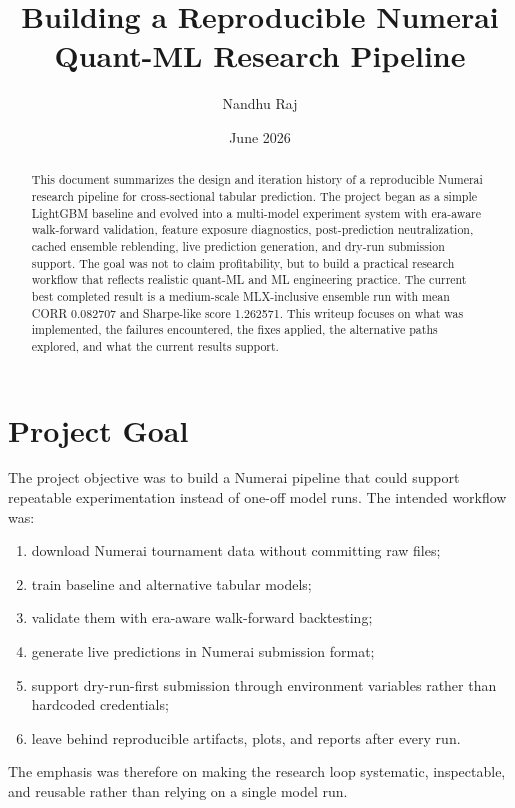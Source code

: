 \documentclass[11pt]{article}
\title{Building a Reproducible Numerai Quant-ML Research Pipeline}
\author{Nandhu Raj}
\date{June 2026}
\begin{document}
\maketitle

\begin{abstract}
This document summarizes the design and iteration history of a reproducible Numerai research pipeline for cross-sectional tabular prediction. The project began as a simple LightGBM baseline and evolved into a multi-model experiment system with era-aware walk-forward validation, feature exposure diagnostics, post-prediction neutralization, cached ensemble reblending, live prediction generation, and dry-run submission support. The goal was not to claim profitability, but to build a practical research workflow that reflects realistic quant-ML and ML engineering practice. The current best completed result is a medium-scale MLX-inclusive ensemble run with mean CORR 0.082707 and Sharpe-like score 1.262571. This writeup focuses on what was implemented, the failures encountered, the fixes applied, the alternative paths explored, and what the current results support.
\end{abstract}

\section{Project Goal}

The project objective was to build a Numerai pipeline that could support repeatable experimentation instead of one-off model runs. The intended workflow was:

\begin{enumerate}[leftmargin=1.5em]
  \item download Numerai tournament data without committing raw files;
  \item train baseline and alternative tabular models;
  \item validate them with era-aware walk-forward backtesting;
  \item generate live predictions in Numerai submission format;
  \item support dry-run-first submission through environment variables rather than hardcoded credentials;
  \item leave behind reproducible artifacts, plots, and reports after every run.
\end{enumerate}

The emphasis was therefore on making the research loop systematic, inspectable, and reusable rather than relying on a single model run.
\end{document}
